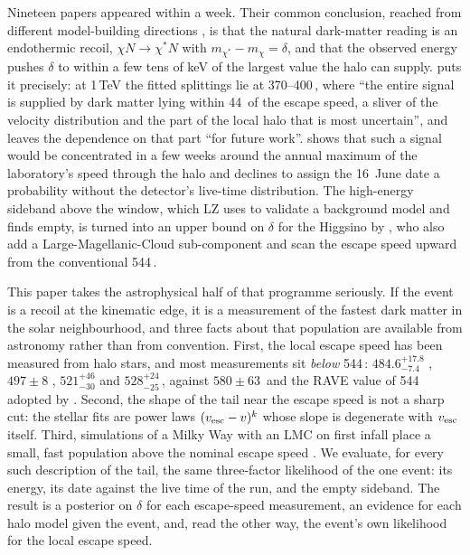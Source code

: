 \documentclass[11pt]{article}
\newcommand{\vesc}{v_{\rm esc}\xspace}
\newcommand{\keV}{\,\mathrm{keV}\xspace}
\newcommand{\kms}{\,\mathrm{km\,s^{-1}}\xspace}
\begin{document}
Nineteen papers appeared within a week.  Their common conclusion, reached from
different model-building directions
\citep{Freese2026higgsino,DiMauro2026edge,McCabe2026seasonal}, is that the natural
dark-matter reading is an endothermic recoil, $\chi N\to\chi^\ast N$ with
$m_{\chi^\ast}-m_\chi=\delta$, and that the observed energy pushes $\delta$ to within a
few tens of keV of the largest value the halo can supply.  \citet{McCabe2026seasonal}
puts it precisely: at 1\,TeV the fitted splittings lie at 370--400\keV, where
``the entire signal is supplied by dark matter lying within 44\kms of the escape
speed, a sliver of the velocity distribution and the part of the local halo that is
most uncertain'', and leaves the dependence on that part ``for future work''.
\citet{DiMauro2026edge} shows that such a signal would be concentrated in a few weeks
around the annual maximum of the laboratory's speed through the halo and declines to
assign the 16~June date a probability without the detector's live-time distribution.
The high-energy sideband above the window, which LZ uses to validate a background
model and finds empty, is turned into an upper bound on $\delta$ for the Higgsino by
\citet{HiggsinoSideband2026}, who also add a Large-Magellanic-Cloud sub-component and
scan the escape speed upward from the conventional 544\kms.

This paper takes the astrophysical half of that programme seriously.  If the event is
a recoil at the kinematic edge, it is a measurement of the fastest dark matter in the
solar neighbourhood, and three facts about that population are available from
astronomy rather than from convention.  First, the local escape speed has been
measured from halo stars, and most measurements sit \emph{below} 544\kms:
$484.6^{+17.8}_{-7.4}$ \citep{NecibLin2022vesc}, $497\pm8$
\citep{Koppelmanvesc}, $521^{+46}_{-30}$ \citep{Roche2024vesc} and
$528^{+24}_{-25}$\kms \citep{Deason2019vesc}, against $580\pm63$\kms
\citep{Monari2018vesc} and the RAVE value of 544\kms adopted by
\citet{Baxter2021conventions}.  Second, the shape of the tail near the escape speed
is not a sharp cut: the stellar fits are power laws $(\vesc-v)^k$ whose slope is
degenerate with $\vesc$ itself.  Third, simulations of a Milky Way with an LMC on
first infall place a small, fast population above the nominal escape speed
\citep{Besla2019lmc,SmithOrlik2023lmc}.  We evaluate, for every such description of
the tail, the same three-factor likelihood of the one event: its energy, its date
against the live time of the run, and the empty sideband.  The result is a posterior
on $\delta$ for each escape-speed measurement, an evidence for each halo model given
the event, and, read the other way, the event's own likelihood for the local escape
speed.
\end{document}

